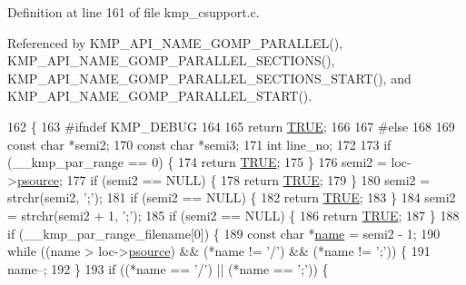 Definition at line 161 of file kmp\-\_\-csupport.\-c.



Referenced by K\-M\-P\-\_\-\-A\-P\-I\-\_\-\-N\-A\-M\-E\-\_\-\-G\-O\-M\-P\-\_\-\-P\-A\-R\-A\-L\-L\-E\-L(), K\-M\-P\-\_\-\-A\-P\-I\-\_\-\-N\-A\-M\-E\-\_\-\-G\-O\-M\-P\-\_\-\-P\-A\-R\-A\-L\-L\-E\-L\-\_\-\-S\-E\-C\-T\-I\-O\-N\-S(), K\-M\-P\-\_\-\-A\-P\-I\-\_\-\-N\-A\-M\-E\-\_\-\-G\-O\-M\-P\-\_\-\-P\-A\-R\-A\-L\-L\-E\-L\-\_\-\-S\-E\-C\-T\-I\-O\-N\-S\-\_\-\-S\-T\-A\-R\-T(), and K\-M\-P\-\_\-\-A\-P\-I\-\_\-\-N\-A\-M\-E\-\_\-\-G\-O\-M\-P\-\_\-\-P\-A\-R\-A\-L\-L\-E\-L\-\_\-\-S\-T\-A\-R\-T().


\begin{DoxyCode}
162 \{
163 \textcolor{preprocessor}{#ifndef KMP\_DEBUG}
164 \textcolor{preprocessor}{}
165     \textcolor{keywordflow}{return} \hyperlink{kmp_8h_aa8cecfc5c5c054d2875c03e77b7be15d}{TRUE};
166 
167 \textcolor{preprocessor}{#else}
168 \textcolor{preprocessor}{}
169     \textcolor{keyword}{const} \textcolor{keywordtype}{char} *semi2;
170     \textcolor{keyword}{const} \textcolor{keywordtype}{char} *semi3;
171     \textcolor{keywordtype}{int} line\_no;
172 
173     \textcolor{keywordflow}{if} (\_\_kmp\_par\_range == 0) \{
174         \textcolor{keywordflow}{return} \hyperlink{kmp_8h_aa8cecfc5c5c054d2875c03e77b7be15d}{TRUE};
175     \}
176     semi2 = loc->\hyperlink{structident_a8c2ccc106967f36d7191d59d4d5a65dc}{psource};
177     \textcolor{keywordflow}{if} (semi2 == NULL) \{
178         \textcolor{keywordflow}{return} \hyperlink{kmp_8h_aa8cecfc5c5c054d2875c03e77b7be15d}{TRUE};
179     \}
180     semi2 = strchr(semi2, \textcolor{charliteral}{';'});
181     \textcolor{keywordflow}{if} (semi2 == NULL) \{
182         \textcolor{keywordflow}{return} \hyperlink{kmp_8h_aa8cecfc5c5c054d2875c03e77b7be15d}{TRUE};
183     \}
184     semi2 = strchr(semi2 + 1, \textcolor{charliteral}{';'});
185     \textcolor{keywordflow}{if} (semi2 == NULL) \{
186         \textcolor{keywordflow}{return} \hyperlink{kmp_8h_aa8cecfc5c5c054d2875c03e77b7be15d}{TRUE};
187     \}
188     \textcolor{keywordflow}{if} (\_\_kmp\_par\_range\_filename[0]) \{
189         \textcolor{keyword}{const} \textcolor{keywordtype}{char} *\hyperlink{ittnotify__static_8h_a1c34b35a4952969fef60192313bba34a}{name} = semi2 - 1;
190         \textcolor{keywordflow}{while} ((name > loc->\hyperlink{structident_a8c2ccc106967f36d7191d59d4d5a65dc}{psource}) && (*name != \textcolor{charliteral}{'/'}) && (*name != \textcolor{charliteral}{';'})) \{
191             name--;
192         \}
193         \textcolor{keywordflow}{if} ((*name == \textcolor{charliteral}{'/'}) || (*name == \textcolor{charliteral}{';'})) \{

\end{DoxyCode}
